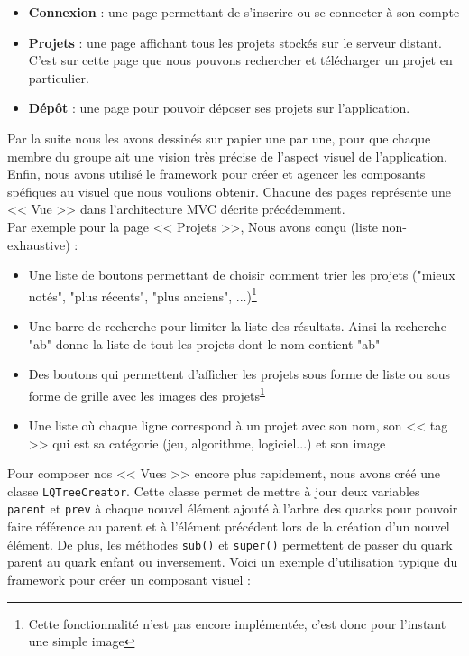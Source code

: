 \documentclass[twoside]{report}
\begin{document}
\begin{itemize}[label=$-$, leftmargin=1.5cm]
    \setlength\itemsep{0em}
    \item \textbf{Connexion} : une page permettant de s'inscrire ou se connecter à son compte
    \item \textbf{Projets} : une page affichant tous les projets stockés sur le serveur distant. C'est sur cette page que nous pouvons rechercher et télécharger un projet en particulier.
    \item \textbf{Dépôt} : une page pour pouvoir déposer ses projets sur l'application.
\end{itemize}

Par la suite nous les avons dessinés sur papier une par une, pour que chaque membre du groupe ait une vision très précise de l'aspect visuel de l'application. Enfin, nous avons utilisé le framework pour créer et agencer les composants spéfiques au visuel que nous voulions obtenir. Chacune des pages représente une << Vue >> dans l'architecture MVC décrite précédemment.\\

Par exemple pour la page << Projets >>, Nous avons conçu (liste non-exhaustive) :
\begin{itemize}[label=$-$]
    \item Une liste de boutons permettant de choisir comment trier les projets ("mieux notés", "plus récents", "plus anciens", ...)\footnote{\label{note}Cette fonctionnalité n'est pas encore implémentée, c'est donc pour l'instant une simple image}
    \item Une barre de recherche pour limiter la liste des résultats. Ainsi la recherche "ab" donne la liste de tout les projets dont le nom contient "ab"
    \item Des boutons qui permettent d'afficher les projets sous forme de liste ou sous forme de grille avec les images des projets\textsuperscript{\ref{note}}
    \item Une liste où chaque ligne correspond à un projet avec son nom, son << tag >> qui est sa catégorie (jeu, algorithme, logiciel...) et son image
\end{itemize}

Pour composer nos << Vues >> encore plus rapidement, nous avons créé une classe \verb!LQTreeCreator!. Cette classe permet de mettre à jour deux variables \verb!parent! et \verb!prev! à chaque nouvel élément ajouté à l'arbre des quarks pour pouvoir faire référence au parent et à l'élément précédent lors de la création d'un nouvel élément. De plus, les méthodes \verb!sub()! et \verb!super()! permettent de passer du quark parent au quark enfant ou inversement. Voici un exemple d'utilisation typique du framework pour créer un composant visuel :\\
\end{document}
